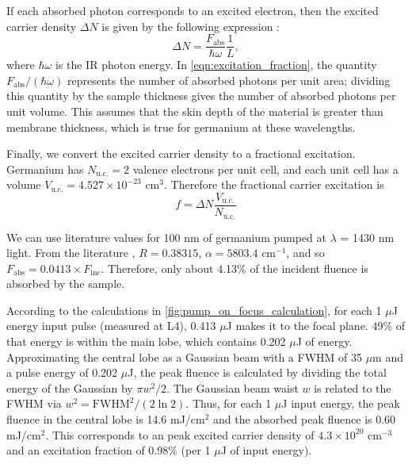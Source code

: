 If each absorbed photon corresponds to an excited electron, then the excited carrier density $\Delta N$ is given by the following expression \cite{cushingDifferentiatingPhotoexcitedCarrier2019}:
\begin{equation}
\Delta N = \frac{F_{\text{abs}}}{\hbar \omega} \frac{1}{L},
\label{eqn:excitation_fraction}
\end{equation}
where $\hbar \omega$ is the IR photon energy. In \cref{eqn:excitation_fraction}, the quantity $F_{\text{abs}} / (\hbar \omega)$ represents the number of absorbed photons per unit area; dividing this quantity by the sample thickness gives the number of absorbed photons per unit volume. This assumes that the skin depth of the material is greater than membrane thickness, which is true for germanium at these wavelengths.

Finally, we convert the excited carrier density to a fractional excitation. Germanium has $N_{\text{u.c.}}=2$ valence electrons per unit cell, and each unit cell has a volume $V_{\text{u.c.}}=4.527 \times 10^{-23} \text{ cm}^{3}$. Therefore the fractional carrier excitation is
\begin{equation}
f = \Delta N \frac{V_{\text{u.c.}}}{N_{\text{u.c.}}}
\end{equation}

We can use literature values for 100 nm of germanium pumped at $\lambda$ = 1430 nm light. From the literature \cite{nunleyOpticalConstantsGermanium2016}, $R = 0.38315$, $\alpha = 5803.4 \text{ cm}^{-1}$, and so $F_{\text{abs}} = 0.0413 \times F_{\text{inc}}$. Therefore, only about 4.13\% of the incident fluence is absorbed by the sample.

According to the calculations in \cref{fig:pump_on_focus_calculation}, for each 1 $\mu$J energy input pulse (measured at L4), 0.413 $\mu$J makes it to the focal plane. 49\% of that energy is within the main lobe, which contains 0.202 $\mu$J of energy. Approximating the central lobe as a Gaussian beam with a FWHM of 35 $\mu$m and a pulse energy of 0.202 $\mu$J, the peak fluence is calculated by dividing the total energy of the Gaussian by $\pi w^2/2$. The Gaussian beam waist $w$ is related to the FWHM via $w^2 = \text{FWHM}^2 / (2 \ln 2)$. Thus, for each 1 $\mu$J input energy, the peak fluence in the central lobe is 14.6 mJ/cm$^2$ and the absorbed peak fluence is 0.60 mJ/cm$^2$. This corresponds to an peak excited carrier density of $4.3 \times 10^{20} \text{ cm}^{-3}$ and an excitation fraction of 0.98\% (per 1 $\mu$J of input energy).



